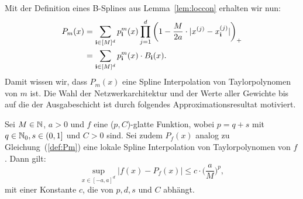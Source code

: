 Mit der Definition eines B-Splines aus Lemma~\ref{lem:loccon} erhalten wir nun:
\begin{equation}
\label{def:Pm}
\begin{split}
P_m(x) &= \sum_{\mathbf{i} \in [M]^d} p_{\mathbf{i}}^m(x) \prod_{j = 1}^{d} \bigg(1 - \frac{M}{2a} \cdot |x^{(j)} - x_{\mathbf{i}}^{(j)}|\bigg)_+ \\
& = \sum_{\mathbf{i} \in [M]^d} p_{\mathbf{i}}^m(x) \cdot B_{\mathbf{i}}(x).
\end{split}
\end{equation}
Damit wissen wir, dass $P_m(x)$ eine Spline Interpolation von Taylorpolynomen von $m$ ist.
Die Wahl der Netzwerkarchitektur und der Werte aller Gewichte bis auf die der Ausgabeschicht ist durch folgendes Approximationsresultat motiviert.
\begin{lem}
\label{lem:pcsmooth}
Sei $M \in \mathbb{N}$, $a > 0$ und $f$ eine ($p, C$)-glatte Funktion, wobei $p = q + s$ mit $q \in \mathbb{N}_0, s \in (0,1]$ und $C > 0$ sind. Sei zudem $P_f(x)$ analog zu Gleichung~(\ref{def:Pm}) eine lokale Spline Interpolation von Taylorpolynomen von $f$. Dann gilt:
$$\sup_{x \in [-a, a]^d} |f(x) - P_f(x)|  \leq c \cdot \bigg(\frac{a}{M}\bigg)^p,$$
mit einer Konstante $c$, die von $p, d, s$ und $C$ abhängt.
\end{lem}
